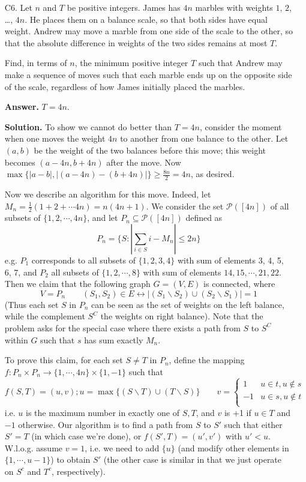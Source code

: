 \documentclass[11pt,a4paper]{article}
\begin{document}
\begin{enumerate}
    	\item [C6.] 
    	Let $n$ and $T$ be positive integers. James has $4n$ marbles with weights $1$, $2$, \dots, $4n$. He places them on a balance scale, so that both sides have equal weight. Andrew may move a marble from one side of the scale to the other, so that the absolute difference in weights of the two sides remains at most $T$.
    	
    	Find, in terms of $n$, the minimum positive integer $T$ such that Andrew may make a sequence of moves such that each marble ends up on the opposite side of the scale, regardless of how James initially placed the marbles.
    	
    	\textbf{Answer.} $T = 4n$. 
    	
    	\textbf{Solution.} To show we cannot do better than $T = 4n$, 
    	consider the moment when one moves the weight $4n$ to another from one balance to the other. 
    	Let $(a, b)$ be the weight of the two balances before this move; 
    	this weight becomes $(a - 4n, b + 4n)$ after the move. 
    	Now $\max \{|a-b|, |(a-4n) - (b + 4n)|\}\ge \frac{8n}{2} = 4n$, as desired. 
    	
    	Now we describe an algorithm for this move. 
    	Indeed, let $M_n = \frac 12 (1 + 2 + \cdots 4n) = n(4n + 1)$. 
    	We consider the set $\mathcal{P}([4n])$ of all subsets of $\{1, 2, \cdots, 4n\}$, 
    	and let $P_n\subseteq \mathcal{P}([4n])$ defined as 
    	\[
    	P_n = \{S: |\sum_{i\in S}i - M_n|\le 2n\}
    	\]
    	e.g. $P_1$ corresponds to all subsets of $\{1, 2, 3, 4\}$ with sum of elements 3, 4, 5, 6, 7, 
    	and $P_2$ all subsets of $\{1, 2, \cdots, 8\}$ with sum of elements $14, 15, \cdots, 21, 22$. 
    	Then we claim that the following graph $G = (V, E)$ is connected, where 
    	\[
    	V = P_n\qquad 
    	(S_1, S_2)\in E \leftrightarrow 
    	|(S_1\backslash S_2)\cup (S_2\backslash S_1)| = 1
    	\]
    	(Thus each set $S$ in $P_n$ can be seen as the set of weights on the left balance, while the complement $S^C$ the weights on right balance). Note that the problem asks for the special case where there exists a path from $S$ to $S^C$ within $G$ such that $s$ has sum exactly $M_n$. 
    	
    	To prove this claim, for each set $S\neq T$ in $P_n$, 
    	define the mapping $f: P_n\times P_n \to \{1, \cdots, 4n\}\times \{1, -1\}$ such that 
    	\[
    	f(S, T) = (u, v); 
    	u = \max \{(S\backslash T)\cup (T\backslash S)\}\qquad 
    	v = \begin{cases}
    		1 & u\in t, u\not\in s\\
    		-1 & u\in s, u\not\in t\\
    	\end{cases}
    	\]
    	i.e. $u$ is the maximum number in exactly one of $S, T$, 
    	and $v$ is +1 if $u\in T$ and $-1$ otherwise. 
    	Our algorithm is to find a path from $S$ to $S'$ such that either $S'=T$ (in which case we're done), 
    	or $f(S', T)=(u', v')$ with $u' < u$. 
    	W.l.o.g. assume $v = 1$, i.e. we need to add $\{u\}$ (and modify other elements in $\{1, \cdots, u - 1\}$) to obtain $S'$ 
    	(the other case is similar in that we just operate on $S^c$ and $T^c$, respectively). 
    	

\end{enumerate}
\end{document}
